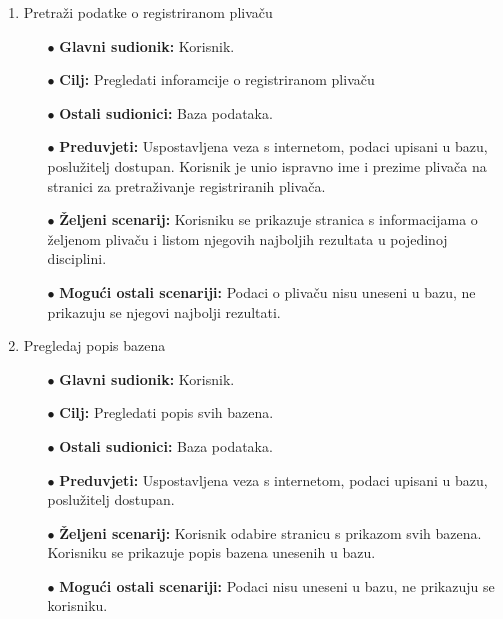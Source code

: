 \documentclass[times, utf8, zavrsni]{fer}
\begin{document}
\begin{enumerate}
    \item Pretraži podatke o registriranom plivaču
    \begin{itemize}
        \item[$\bullet$] \textbf{Glavni sudionik:} Korisnik.
        \item[$\bullet$] \textbf{Cilj:} Pregledati inforamcije o registriranom plivaču
        \item[$\bullet$] \textbf{Ostali sudionici:} Baza podataka.
        \item[$\bullet$] \textbf{Preduvjeti:} Uspostavljena veza s internetom, podaci upisani u bazu, poslužitelj dostupan. 
        Korisnik je unio ispravno ime i prezime plivača na stranici za pretraživanje registriranih plivača.
        \item[$\bullet$] \textbf{Željeni scenarij:} Korisniku se prikazuje stranica
        s informacijama o željenom plivaču i listom njegovih najboljih rezultata u pojedinoj disciplini.
        \item[$\bullet$] \textbf{Mogući ostali scenariji:} Podaci o plivaču nisu uneseni u bazu, ne prikazuju se njegovi najbolji rezultati.
    \end{itemize}

    \item Pregledaj popis bazena
    \begin{itemize}
        \item[$\bullet$] \textbf{Glavni sudionik:} Korisnik.
        \item[$\bullet$] \textbf{Cilj:} Pregledati popis svih bazena. 
        \item[$\bullet$] \textbf{Ostali sudionici:} Baza podataka.
        \item[$\bullet$] \textbf{Preduvjeti:} Uspostavljena veza s internetom, podaci upisani u bazu, poslužitelj dostupan.
        \item[$\bullet$] \textbf{Željeni scenarij:} Korisnik odabire stranicu s prikazom svih bazena. Korisniku se prikazuje popis bazena
        unesenih u bazu.
        \item[$\bullet$] \textbf{Mogući ostali scenariji:} Podaci nisu uneseni u bazu, ne prikazuju se korisniku.
    \end{itemize}
    

\end{enumerate}
\end{document}
